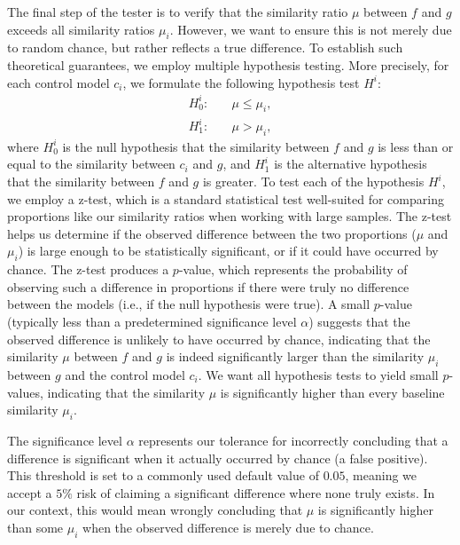 The final step of the tester is to verify that the similarity ratio $\mu$ between $f$ and $g$ exceeds all similarity ratios $\mu_i$. However, we want to ensure this is not merely due to random chance, but rather reflects a true difference. To establish such theoretical guarantees, we employ multiple hypothesis testing.
More precisely, for each control model $c_i$, we formulate the following hypothesis test $H^i$:
\begin{align*}
H_0^i: & \quad \mu \leq \mu_i, \\
H_1^i: & \quad \mu > \mu_i,
\end{align*}
where $H_0^i$ is the null hypothesis that the similarity between $f$ and $g$ is less than or equal to the similarity between $c_i$ and $g$, and $H_1^i$ is the alternative hypothesis that the similarity between $f$ and $g$ is greater.  
%
To test each of the hypothesis $H^i$, we employ a z-test, which is a standard statistical test well-suited for comparing proportions like our similarity ratios when working with large samples. The z-test helps us determine if the observed difference between the two proportions ($\mu$ and $\mu_i$) is large enough to be statistically significant, or if it could have occurred by chance.
%
The z-test produces a $p$-value, which represents the probability of observing such a difference in proportions if there were truly no difference between the models (i.e., if the null hypothesis were true). A small $p$-value (typically less than a predetermined significance level $\alpha$) suggests that the observed difference is unlikely to have occurred by chance, indicating that the similarity $\mu$ between $f$ and $g$ is indeed significantly larger than the similarity $\mu_i$ between $g$ and the control model $c_i$.
We want all hypothesis tests to yield small $p$-values, indicating that the similarity $\mu$ is significantly higher than every baseline similarity $\mu_i$. 

The significance level $\alpha$ represents our tolerance for incorrectly concluding that a difference is significant when it actually occurred by chance (a false positive). This threshold is set to a commonly used default value of $0.05$, meaning we accept a $5\%$ risk of claiming a significant difference where none truly exists. In our context, this would mean wrongly concluding that $\mu$ is significantly higher than some $\mu_i$ when the observed difference is merely due to chance.


